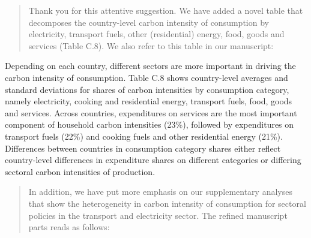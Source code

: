 \documentclass[11pt]{article}
\newenvironment{response}
{\begin{quote}\color{black}}
{\end{quote}}
\begin{document}
\begin{response}

    Thank you for this attentive suggestion. We have added a novel table that decomposes the country-level carbon intensity of consumption by electricity, transport fuels, other (residential) energy, food, goods and services (Table C.8). We also refer to this table in our manuscript:
\end{response}

\begin{revisionbox}
    Depending on each country, different sectors are more important in driving the carbon intensity of consumption. Table C.8 shows country-level averages and standard deviations for shares of carbon intensities by consumption category, namely electricity, cooking and residential energy, transport fuels, food, goods and services. Across countries, expenditures on services are the most important component of household carbon intensities (23\%), followed by expenditures on transport fuels (22\%) and cooking fuels and other residential energy (21\%). Differences between countries in consumption category shares either reflect country-level differences in expenditure shares on different categories or differing sectoral carbon intensities of production.
\end{revisionbox}

\begin{response}
    In addition, we have put more emphasis on our supplementary analyses that show the heterogeneity in carbon intensity of consumption for sectoral policies in the transport and electricity sector. The refined manuscript parts reads as follows:
\end{response}
\end{document}
